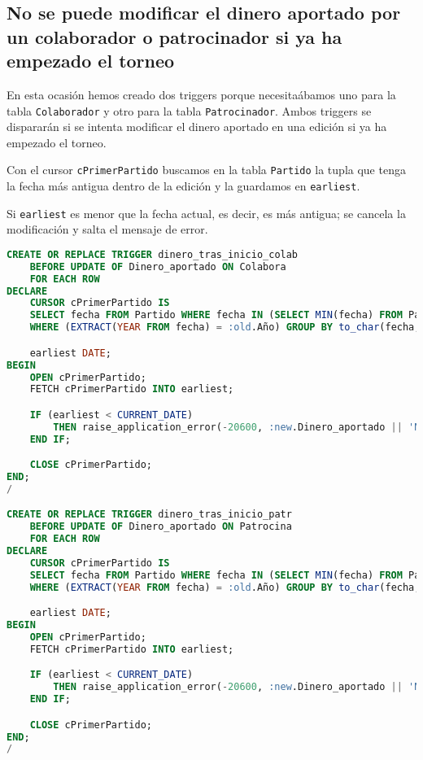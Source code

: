 \subsection{No se puede modificar el dinero aportado por un colaborador o patrocinador si ya ha empezado el torneo}
En esta ocasión hemos creado dos triggers porque necesitaábamos uno para la tabla
\texttt{Colaborador} y otro para la tabla \texttt{Patrocinador}. Ambos triggers
se dispararán si se intenta modificar el dinero aportado en una edición si ya ha
empezado el torneo.

Con el cursor \texttt{cPrimerPartido} buscamos en la tabla \texttt{Partido} la
tupla que tenga la fecha más antigua dentro de la edición y la guardamos en
\texttt{earliest}.

Si \texttt{earliest} es menor que la fecha actual, es decir, es más antigua; se
cancela la modificación y salta el mensaje de error.

\begin{lstlisting}[language=sql]
CREATE OR REPLACE TRIGGER dinero_tras_inicio_colab
	BEFORE UPDATE OF Dinero_aportado ON Colabora
	FOR EACH ROW
DECLARE
	CURSOR cPrimerPartido IS
	SELECT fecha FROM Partido WHERE fecha IN (SELECT MIN(fecha) FROM Partido
	WHERE (EXTRACT(YEAR FROM fecha) = :old.Año) GROUP BY to_char(fecha,'YYYY')) GROUP BY fecha;

	earliest DATE;
BEGIN
	OPEN cPrimerPartido;
	FETCH cPrimerPartido INTO earliest;

	IF (earliest < CURRENT_DATE)
		THEN raise_application_error(-20600, :new.Dinero_aportado || 'No se puede modificar el dinero aportado si ya ha comenzado el torneo');
	END IF;

	CLOSE cPrimerPartido;
END;
/

CREATE OR REPLACE TRIGGER dinero_tras_inicio_patr
	BEFORE UPDATE OF Dinero_aportado ON Patrocina
	FOR EACH ROW
DECLARE
	CURSOR cPrimerPartido IS
	SELECT fecha FROM Partido WHERE fecha IN (SELECT MIN(fecha) FROM Partido
	WHERE (EXTRACT(YEAR FROM fecha) = :old.Año) GROUP BY to_char(fecha,'YYYY')) GROUP BY fecha;

	earliest DATE;
BEGIN
	OPEN cPrimerPartido;
	FETCH cPrimerPartido INTO earliest;

	IF (earliest < CURRENT_DATE)
		THEN raise_application_error(-20600, :new.Dinero_aportado || 'No se puede modificar el dinero aportado si ya ha comenzado el torneo');
	END IF;

	CLOSE cPrimerPartido;
END;
/
\end{lstlisting}

